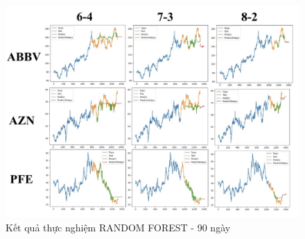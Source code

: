\documentclass[conference]{IEEEtran}
\begin{document}
\begin{figure}[H]
    \centering
    \begin{minipage}{0.5\textwidth}
    \centering
    \includegraphics[width=1\textwidth]{Image/RF90.jpg}
    \caption{Kết quả thực nghiệm RANDOM FOREST - 90 ngày}
    \label{fig:1}
    \end{minipage}
\end{figure}
\end{document}
